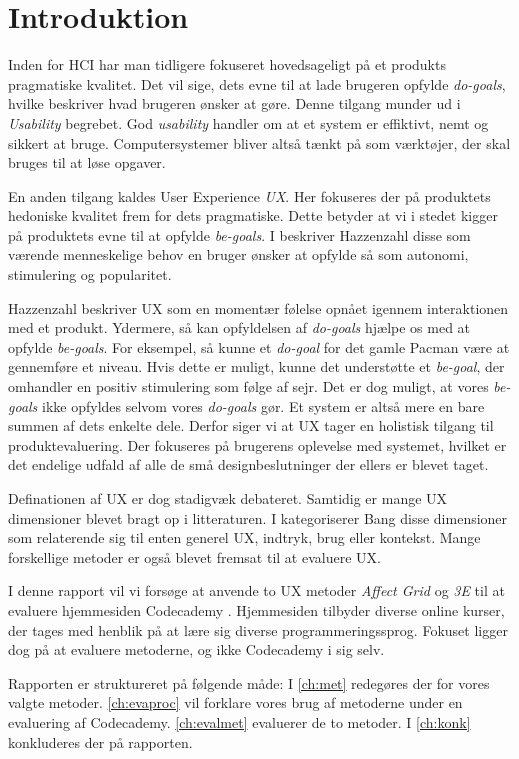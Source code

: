 \chapter{Introduktion}\label{ch:intro}
Inden for HCI har man tidligere fokuseret hovedsageligt på et produkts pragmatiske kvalitet. Det vil sige, dets evne til at lade brugeren opfylde \textit{do-goals}, hvilke beskriver hvad brugeren ønsker at gøre. Denne tilgang munder ud i \textit{Usability} begrebet. God \textit{usability} handler om at et system er effiktivt, nemt og sikkert at bruge. Computersystemer bliver altså tænkt på som værktøjer, der skal bruges til at løse opgaver.

En anden tilgang kaldes User Experience \textit{UX}. Her fokuseres der på produktets hedoniske kvalitet frem for dets pragmatiske. Dette betyder at vi i stedet kigger på produktets evne til at opfylde \textit{be-goals}. I \cite{Hassenzahl:2008} beskriver Hazzenzahl disse som værende menneskelige behov en bruger ønsker at opfylde så som autonomi, stimulering og popularitet.

Hazzenzahl beskriver UX som en momentær følelse opnået igennem interaktionen med et produkt. Ydermere, så kan opfyldelsen af \textit{do-goals} hjælpe os med at opfylde \textit{be-goals}. For eksempel, så kunne et \textit{do-goal} for det gamle Pacman være at gennemføre et niveau. Hvis dette er muligt, kunne det understøtte et \textit{be-goal}, der omhandler en positiv stimulering som følge af sejr. Det er dog muligt, at vores \textit{be-goals} ikke opfyldes selvom vores \textit{do-goals} gør. Et system er altså mere en bare summen af  dets enkelte dele. Derfor siger vi at UX tager en holistisk tilgang til produktevaluering. Der fokuseres på brugerens oplevelse med systemet, hvilket er det endelige udfald af alle de små designbeslutninger der ellers er blevet taget.  

Definationen af UX er dog stadigvæk debateret. Samtidig er mange UX dimensioner blevet bragt op i litteraturen. I \cite{Bang2015} kategoriserer Bang disse dimensioner som relaterende sig til enten generel UX, indtryk, brug eller kontekst. Mange forskellige metoder er også blevet fremsat til at evaluere UX. 

I denne rapport vil vi forsøge at anvende to UX metoder \textit{Affect Grid} og \textit{3E} til at evaluere hjemmesiden Codecademy \cite{Codecademy}. Hjemmesiden tilbyder diverse online kurser, der tages med henblik på at lære sig diverse programmeringssprog. Fokuset ligger dog på at evaluere metoderne, og ikke Codecademy i sig selv. 

Rapporten er struktureret på følgende måde: I \cref{ch:met} redegøres der for vores valgte metoder. \cref{ch:evaproc} vil forklare vores brug af metoderne under en evaluering af Codecademy. \cref{ch:evalmet} evaluerer de to metoder. I \cref{ch:konk} konkluderes der på rapporten.



   